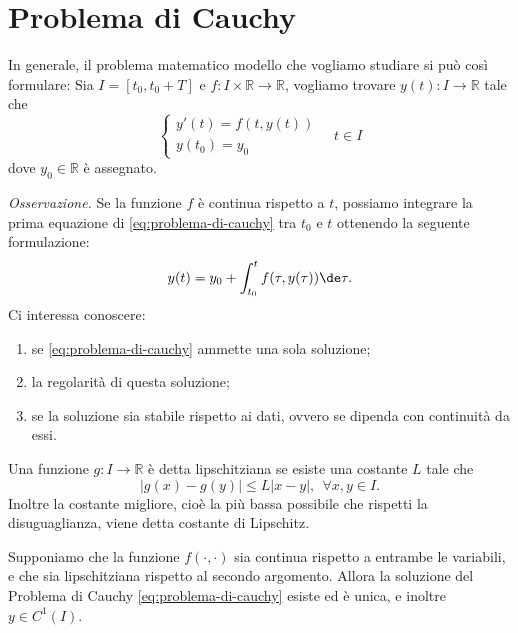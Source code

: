 \section{Problema di Cauchy}
In generale, il problema matematico modello che vogliamo studiare si può così formulare:
Sia $I=[ t_{0} ,t_{0} +T]$ e $f:I\times \mathbb{R}\rightarrow \mathbb{R}$, vogliamo trovare $y(t) :I\rightarrow \mathbb{R}$ tale che
\begin{equation}
\tag{PC}
\begin{cases}
y'(t) =f( t,y(t))\\
y( t_{0}) =y_{0}
\end{cases} \quad t\in I
\label{eq:problema-di-cauchy}
\end{equation}
dove $y_{0} \in \mathbb{R}$ è assegnato.

\textit{Osservazione.}
Se la funzione $f$ è continua rispetto a $t$, possiamo integrare la prima equazione di \eqref{eq:problema-di-cauchy} tra $t_{0}$ e $t$ ottenendo la seguente formulazione:
\begin{equation*}
y(t) =y_{0} +\int\nolimits ^{t}_{t_{0}} f( \tau ,y( \tau )) \de\tau.
\end{equation*}
Ci interessa conoscere:
\begin{enumerate}
\item se \eqref{eq:problema-di-cauchy} ammette una sola soluzione;
\item la regolarità di questa soluzione;
\item se la soluzione sia stabile rispetto ai dati, ovvero se dipenda con continuità da essi.
\end{enumerate}

\begin{definition}
Una funzione $g:I\rightarrow \mathbb{R}$ è detta lipschitziana se esiste una costante $L$ tale che
\begin{equation*}
| g( x) -g( y)| \leqslant L| x-y| ,\ \ \forall x,y\in I.
\end{equation*}
Inoltre la costante migliore, cioè la più bassa possibile che rispetti la disuguaglianza, viene detta costante di Lipschitz.
\end{definition}

\begin{theorem}
Supponiamo che la funzione $f( \cdot ,\cdot )$ sia continua rispetto a entrambe le variabili, e che sia lipschitziana rispetto al secondo argomento.
Allora la soluzione del Problema di Cauchy \eqref{eq:problema-di-cauchy} esiste ed è unica, e inoltre $y\in C^{1}(I)$.
\label{thm:esistenza-unicita-PC}
\end{theorem}

